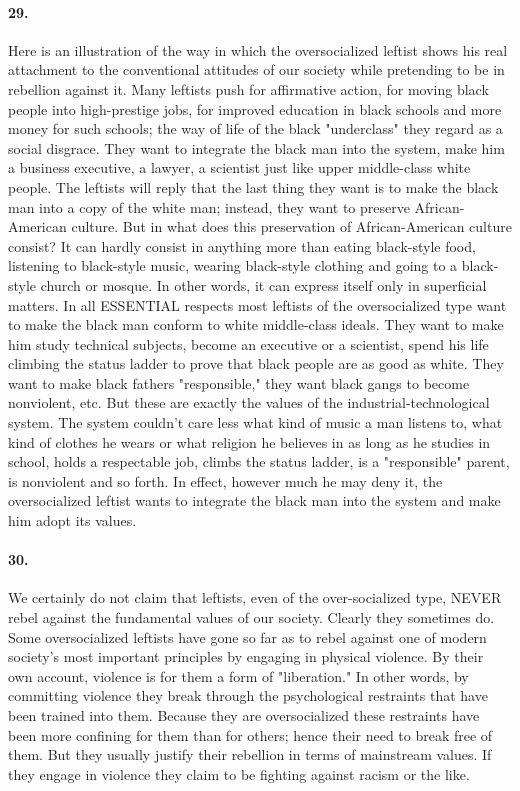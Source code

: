 \documentclass[12pt]{book}
\begin{document}
\paragraph{29.}  Here is an illustration of the way in which the oversocialized leftist shows his real attachment to the conventional attitudes of our society while pretending to be in rebellion against it. Many leftists push for affirmative action, for moving black people into high-prestige jobs, for improved education in black schools and more money for such schools; the way of life of the black "underclass" they regard as a social disgrace. They want to integrate the black man into the system, make him a business executive, a lawyer, a scientist just like upper middle-class white people. The leftists will reply that the last thing they want is to make the black man into a copy of the white man; instead, they want to preserve African-American culture.  But in what does this preservation of African-American culture consist? It can hardly consist in anything more than eating black-style food, listening to black-style music, wearing black-style clothing and going to a black-style church or mosque. In other words, it can express itself only in superficial matters. In all ESSENTIAL respects most leftists of the oversocialized type want to make the black man conform to white middle-class ideals. They want to make him study technical subjects, become an executive or a scientist, spend his life climbing the status ladder to prove that black people are as good as white. They want to make black fathers "responsible," they want black gangs to become nonviolent, etc. But these are exactly the values of the industrial-technological system. The system couldn't care less what kind of music a man listens to, what kind of clothes he wears or what religion he believes in as long as he studies in school, holds a respectable job, climbs the status ladder, is a "responsible" parent, is nonviolent and so forth. In effect, however much he may deny it, the oversocialized leftist wants to integrate the black man into the system and make him adopt its values.


\paragraph{30.} We certainly do not claim that leftists, even of the over-socialized type, NEVER rebel against the fundamental values of our society. Clearly they sometimes do. Some oversocialized leftists have gone so far as to rebel against one of modern society's most important principles by engaging in physical violence. By their own account, violence is for them a form of "liberation." In other words, by committing violence they break through the psychological restraints that have been trained into them. Because they are oversocialized these restraints have been more confining for them than for others; hence their need to break free of them. But they usually justify their rebellion in terms of mainstream values. If they engage in violence they claim to be fighting against racism or the like.
\end{document}
